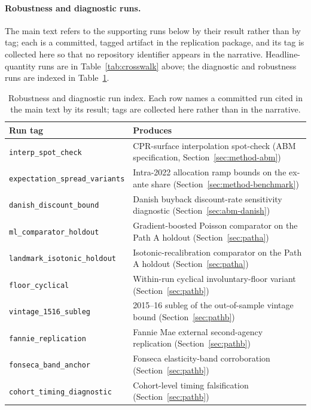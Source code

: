 \documentclass[12pt]{article}
\begin{document}
\paragraph{Robustness and diagnostic runs.} The main text refers to the supporting runs below by their result rather than by tag; each is a committed, tagged artifact in the replication package, and its tag is collected here so that no repository identifier appears in the narrative. Headline-quantity runs are in Table~\ref{tab:crosswalk} above; the diagnostic and robustness runs are indexed in Table~\ref{tab:runindex}.

\begin{table}[H]
\centering
\footnotesize
\begin{threeparttable}
\caption{Robustness and diagnostic run index. Each row names a committed run cited in the main text by its result; tags are collected here rather than in the narrative.}
\label{tab:runindex}
\begin{tabular}{@{}p{5.4cm}p{8.8cm}@{}}
\toprule
Run tag & Produces \\
\midrule
\texttt{interp\_spot\_check} & CPR-surface interpolation spot-check (ABM specification, Section~\ref{sec:method-abm}) \\
\texttt{expectation\_spread\_variants} & Intra-2022 allocation ramp bounds on the ex-ante share (Section~\ref{sec:method-benchmark}) \\
\texttt{danish\_discount\_bound} & Danish buyback discount-rate sensitivity diagnostic (Section~\ref{sec:abm-danish}) \\
\texttt{ml\_comparator\_holdout} & Gradient-boosted Poisson comparator on the Path A holdout (Section~\ref{sec:patha}) \\
\texttt{landmark\_isotonic\_holdout} & Isotonic-recalibration comparator on the Path A holdout (Section~\ref{sec:patha}) \\
\texttt{floor\_cyclical} & Within-run cyclical involuntary-floor variant (Section~\ref{sec:pathb}) \\
\texttt{vintage\_1516\_subleg} & 2015--16 subleg of the out-of-sample vintage bound (Section~\ref{sec:pathb}) \\
\texttt{fannie\_replication} & Fannie Mae external second-agency replication (Section~\ref{sec:pathb}) \\
\texttt{fonseca\_band\_anchor} & Fonseca elasticity-band corroboration (Section~\ref{sec:pathb}) \\
\texttt{cohort\_timing\_diagnostic} & Cohort-level timing falsification (Section~\ref{sec:pathb}) \\

\end{tabular}
\end{threeparttable}
\end{table}
\end{document}

